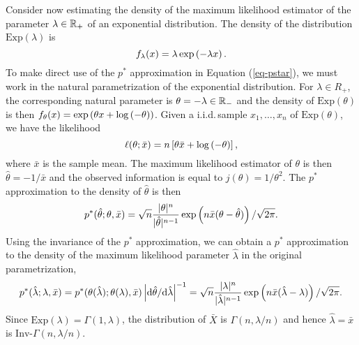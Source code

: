 \begin{example}
    Consider now estimating the density of the maximum likelihood estimator of the parameter $\lambda \in \mathbb{R}_+$ of an exponential distribution. The density of the distribution $\text{Exp}(\lambda)$ is
    \begin{equation*}
        f_\lambda(x) = \lambda \exp\left(-\lambda x\right).
    \end{equation*}
    To make direct use of the $p^*$ approximation in Equation (\ref{eq-pstar}), we must work in the natural parametrization of the exponential distribution. For $\lambda \in R_+$, the corresponding natural parameter is $\theta = -\lambda \in \mathbb{R}_-$ and the density of $\text{Exp}(\theta)$ is then $f_\theta(x) = \exp\left( \theta x + \log\left(-\theta\right)\right)$. Given a i.i.d.\,sample $x_1, \ldots, x_n$ of $\text{Exp}(\theta)$, we have the likelihood
    \begin{equation*}
        \ell(\theta; \bar x) = n\left[\theta \bar x + \log\left(-\theta\right)\right],
    \end{equation*}
    where $\bar x$ is the sample mean. The maximum likelihood estimator of $\theta$ is then $\hat\theta = -1/\bar x$ and the observed information  is equal to $j(\theta) = 1/\theta^2$. The $p^*$ approximation to the density of $\hat\theta$ is then
    \begin{equation*}
        p^*(\hat\theta; \theta, \bar x) = \sqrt{n} \frac{|\theta|^n}{|\hat\theta|^{n-1}}\exp\left(n\bar x(\theta - \hat\theta)\right) / \sqrt{2\pi}.
    \end{equation*}
    Using the invariance of the $p^*$ approximation, we can obtain a $p^*$ approximation to the density of the maximum likelihood parameter $\hat\lambda$ in the original parametrization,
    \begin{equation*}
        p^*(\hat\lambda; \lambda, \bar x) = p^*(\theta(\hat\lambda); \theta(\lambda), \bar x) \left|\text{d} \hat\theta / \text{d} \hat\lambda\right|^{-1} = \sqrt{n} \frac{|\lambda|^n}{|\hat\lambda|^{n-1}}\exp\left(n\bar x(\hat\lambda - \lambda)\right) / \sqrt{2\pi}.
    \end{equation*}
    Since $\text{Exp}(\lambda) = \Gamma(1, \lambda)$, the distribution of $\bar X$ is $\Gamma(n, \lambda/n)$ and hence $\hat\lambda = \bar x$ is $\text{Inv-}\Gamma(n, \lambda/n)$. 




\end{example}
